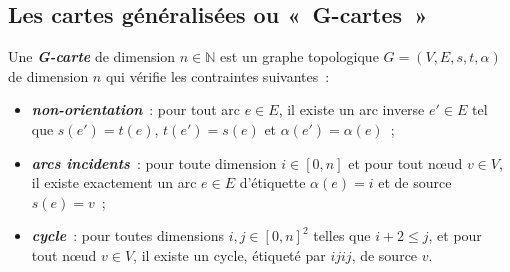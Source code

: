

\subsection[Les cartes généralisées ou «~G-cartes~»]{Les cartes généralisées ou
	«~G-cartes~»}
\label{sec:etat-art-cartes-generalisees}

\cite{Damiand-Lienhardt14,lienhardt1991topological}

\begin{definition}[G-Carte]
	\label{def:gcarte}
	Une \textbf{\emph{G-carte}} de dimension $n \in \mathbb{N}$ est un graphe topologique
	$G = (V,E,s,t,\alpha)$ de dimension $n$ qui vérifie les contraintes suivantes~:
	\begin{itemize}
		\item \textbf{\emph{non-orientation}}~: pour tout arc
		      $e \in E$, il existe un arc inverse $e' \in E$ tel que
		      $s(e') = t(e)$, $t(e') = s(e)$ et $\alpha(e') = \alpha(e)$~;
		\item \textbf{\emph{arcs incidents}}~: pour toute dimension $i \in [0,n]$ et pour tout nœud $v \in V$,
		      il existe exactement un arc $e \in E$ d'étiquette $\alpha(e)=i$ et de source
		      $s(e)=v$~;
		\item \textbf{\emph{cycle}}~: pour toutes dimensions $i, j \in [0,n]^{2}$ telles que $i+2 \leq j$, et
		      pour tout nœud $v \in V$, il existe un cycle, étiqueté par \emph{$ijij$}, de source
		      $v$.
	\end{itemize}
\end{definition}

~


~

